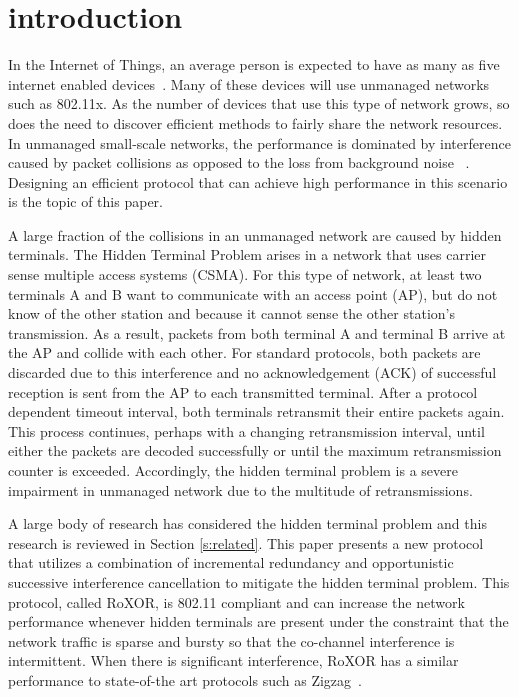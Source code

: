 \section{introduction}
\label{sec:intro}

In the Internet of Things, an average person is expected to have as many as five internet enabled devices~\cite{cisco}. Many of these devices will use unmanaged networks such as  802.11x. As the number of devices that use this type of network grows, so does the need to discover efficient  methods to fairly share the network resources. In unmanaged small-scale networks, the performance is dominated
by interference caused by packet collisions as opposed to the loss from background noise ~\cite{jigsaw}. Designing an efficient protocol that can achieve high performance in this scenario is the topic of this paper. 

A large fraction of the collisions in an unmanaged network are caused by hidden terminals.  The Hidden Terminal Problem arises in a network that uses carrier sense multiple access systems (CSMA). For this type of network, at least two terminals  A and B want to communicate with an access point (AP), but do not know of 
the other station and because it cannot sense the other station's transmission. As a result, packets from both terminal A and terminal B arrive at the AP and collide with each other. For standard protocols, both packets are discarded due to this interference and no acknowledgement (ACK)  of successful reception is sent from the AP to each transmitted terminal. After a protocol dependent timeout interval, both terminals retransmit their entire packets again. This process continues, perhaps with a changing retransmission interval, until either the packets are decoded successfully or until the maximum retransmission counter is exceeded. Accordingly, the hidden terminal problem is a severe impairment in unmanaged network due to the multitude of retransmissions.

A large body of research has considered the hidden terminal problem and this research is reviewed in Section \ref{s:related}. This paper presents a new protocol that utilizes a combination of incremental redundancy and opportunistic successive interference cancellation to mitigate the hidden terminal problem. This protocol, called RoXOR, is 802.11 compliant and can increase the network performance whenever hidden terminals are present under the constraint that the network traffic is sparse  and bursty so that the co-channel interference is intermittent. When there is significant interference,  RoXOR has a similar performance to state-of-the art protocols such as Zigzag~\cite{zigzag}.

